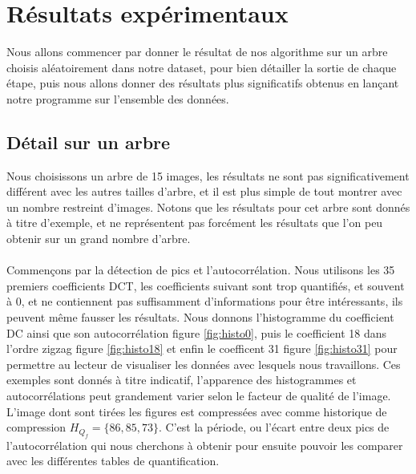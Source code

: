 \documentclass[utf8,final]{stageM2R} %
\begin{document}
\section{Résultats expérimentaux}

Nous allons commencer par donner le résultat de nos algorithme sur un arbre choisis aléatoirement dans notre dataset, pour bien détailler la sortie de chaque étape, puis nous allons donner des résultats plus significatifs obtenus en lançant notre programme sur l'ensemble des données.

\subsection{Détail sur un arbre}
Nous choisissons un arbre de 15 images, les résultats ne sont pas significativement différent avec les autres tailles d'arbre, et il est plus simple de tout montrer avec un nombre restreint d'images. Notons que les résultats pour cet arbre sont donnés à titre d'exemple, et ne représentent pas forcément les résultats que l'on peu obtenir sur un grand nombre d'arbre.
\paragraph{}
Commençons par la détection de pics et l'autocorrélation. Nous utilisons les 35 premiers coefficients DCT, les coefficients suivant sont trop quantifiés, et souvent à 0, et ne contiennent pas suffisamment d'informations pour être intéressants, ils peuvent même fausser les résultats. Nous donnons l'histogramme du coefficient DC ainsi que son autocorrélation figure \ref{fig:histo0}, puis le coefficient 18 dans l'ordre zigzag figure \ref{fig:histo18} et enfin le coefficent 31 figure \ref{fig:histo31} pour permettre au lecteur de visualiser les données avec lesquels nous travaillons. Ces exemples sont donnés à titre indicatif, l'apparence des histogrammes et autocorrélations peut grandement varier selon le facteur de qualité de l'image. L'image dont sont tirées les figures est compressées avec comme historique de compression $H_{Q_{f}} = \{86, 85, 73\}$. C'est la période, ou l'écart entre deux pics de l'autocorrélation qui nous cherchons à obtenir pour ensuite pouvoir les comparer avec les différentes tables de quantification.
\end{document}
